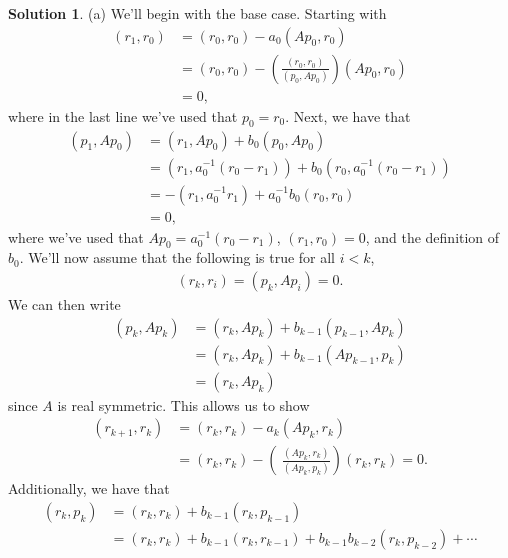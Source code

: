 \documentclass[12pt]{article}
\theoremstyle{definition}
\newtheorem{sol}{Solution}
\theoremstyle{remark}
\begin{document}
\begin{sol}
    (a) We'll begin with the base case. Starting with
    \begin{align*}
        (r_{1}, r_{0}) &= (r_{0}, r_{0}) - a_{0} (A p_{0}, r_{0})\\
                       &= (r_{0}, r_{0}) - \left(\frac{(r_{0}, r_{0})}{(p_{0}, A p_{0})}\right) (A p_{0}, r_{0}) \\
                       &= 0,
    \end{align*}
    where in the last line we've used that $p_{0} = r_{0}$. Next, we have that
    \begin{align*}
        (p_{1}, A p_{0}) &= (r_{1}, A p_{0}) + b_{0} (p_{0}, A p_{0})\\
                         &= (r_{1}, a_{0}^{-1}(r_{0} - r_{1})) + b_{0} (r_{0}, a_{0}^{-1}(r_{0} - r_{1}))\\
                         &= -(r_{1}, a_{0}^{-1}r_{1}) + a_{0}^{-1}b_{0} (r_{0}, r_{0} )\\
                         &= 0,
    \end{align*}
    where we've used that $Ap_{0} = a_{0}^{-1}(r_{0} - r_{1})$, $(r_{1}, r_{0}) = 0$, and the definition of $b_{0}$. We'll now assume that the following is true for all $i < k$,
    \begin{align*}
        (r_{k}, r_{i}) = (p_{k}, A p_{i} ) = 0.
    \end{align*}
    We can then write 
    \begin{align*}
        (p_{k}, Ap_{k}) &= (r_{k}, Ap_{k}) + b_{k-1} (p_{k-1}, A p_{k})\\
                        &= (r_{k}, A p_{k}) + b_{k-1}(A p_{k-1}, p_{k})\\
                        &= (r_{k}, A p_{k})
    \end{align*}
    since $A$ is real symmetric. This allows us to show
    \begin{align*}
        (r_{k+1}, r_{k}) &= (r_{k}, r_{k}) - a_{k} (A p_{k}, r_{k}) \\
                         &= (r_{k}, r_{k}) - \left(\ \frac{(Ap_{k}, r_{k})}{(A p_{k}, p_{k})}  \right) (r_{k}, r_{k}) = 0.
    \end{align*}
    Additionally, we have that
    \begin{align*}
        (r_{k}, p_{k}) &= (r_{k}, r_{k}) + b_{k-1} (r_{k}, p_{k-1})\\
                       &= (r_{k}, r_{k}) + b_{k-1} (r_{k}, r_{k-1}) + b_{k-1}b_{k-2}(r_{k}, p_{k-2})+ \cdots \\

\end{align*}
\end{sol}
\end{document}
